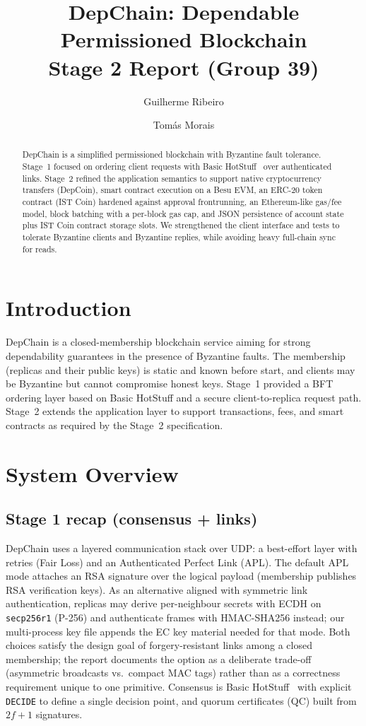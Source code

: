 \documentclass[runningheads]{llncs}
\title{DepChain: Dependable Permissioned Blockchain\\Stage 2 Report (Group 39)}
\author{Guilherme Ribeiro \and Tomás Morais}
\institute{Instituto Superior Técnico, University of Lisbon, Portugal\\
IST student nos.\ 103562, 103619}
\begin{document}
\maketitle

\begin{abstract}
DepChain is a simplified permissioned blockchain with Byzantine fault tolerance.
Stage~1 focused on ordering client requests with Basic HotStuff~\cite{hotstuff} over authenticated links.
Stage~2 refined the application semantics to support native cryptocurrency transfers (DepCoin),
smart contract execution on a Besu EVM, an ERC-20 token contract (IST Coin) hardened against approval frontrunning,
an Ethereum-like gas/fee model, block batching with a per-block gas cap, and JSON persistence of account state plus
IST Coin contract storage slots. We strengthened the client interface and tests to tolerate Byzantine clients and Byzantine replies,
while avoiding heavy full-chain sync for reads.
\end{abstract}

\section{Introduction}
DepChain is a closed-membership blockchain service aiming for strong dependability guarantees in the presence of Byzantine faults.
The membership (replicas and their public keys) is static and known before start, and clients may be Byzantine but cannot compromise honest keys.
Stage~1 provided a BFT ordering layer based on Basic HotStuff and a secure client-to-replica request path.
Stage~2 extends the application layer to support transactions, fees, and smart contracts as required by the Stage~2 specification.

\section{System Overview}
\subsection{Stage 1 recap (consensus + links)}
DepChain uses a layered communication stack over UDP: a best-effort layer with retries (Fair Loss) and an Authenticated Perfect Link (APL).
The default APL mode attaches an RSA signature over the logical payload (membership publishes RSA verification keys).
As an alternative aligned with symmetric link authentication, replicas may derive per-neighbour secrets with ECDH on \texttt{secp256r1} (P-256)
and authenticate frames with HMAC-SHA256 instead; our multi-process key file appends the EC key material needed for that mode.
Both choices satisfy the design goal of forgery-resistant links among a closed membership; the report documents the option as a deliberate
trade-off (asymmetric broadcasts vs.\ compact MAC tags) rather than as a correctness requirement unique to one primitive.
Consensus is Basic HotStuff~\cite{hotstuff} with explicit \texttt{DECIDE} to define a single decision point, and quorum certificates (QC) built from $2f+1$ signatures.
\end{document}
